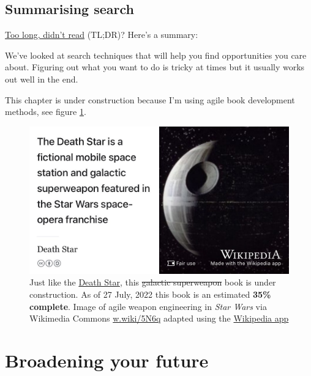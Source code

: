 \documentclass[
]{book}
\begin{document}
\hypertarget{tldr8}{%
\section{Summarising search}\label{tldr8}}

\href{https://en.wiktionary.org/wiki/too_long;_didn\%27t_read}{Too long, didn't read} (TL;DR)? Here's a summary:

We've looked at search techniques that will help you find opportunities you care about. Figuring out what you want to do is tricky at times but it usually works out well in the end.

This chapter is under construction because I'm using agile book development methods, see figure \ref{fig:deathstar5-fig}.

\begin{figure}

{\centering \includegraphics[width=0.99\linewidth]{images/DeathStar2} 

}

\caption{Just like the \href{https://en.wikipedia.org/wiki/Death_Star}{Death Star}, this \sout{galactic superweapon} book is under construction. As of 27 July, 2022 this book is an estimated \textbf{35\% complete}. Image of agile weapon engineering in \emph{Star Wars} via Wikimedia Commons \href{https://w.wiki/5N6q}{w.wiki/5N6q} adapted using the \href{https://apps.apple.com/gb/app/wikipedia/id324715238}{Wikipedia app}}\label{fig:deathstar5-fig}
\end{figure}

\hypertarget{broadening}{%
\chapter{Broadening your future}\label{broadening}}
\end{document}
